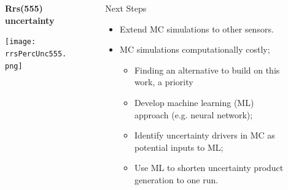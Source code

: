 \documentclass[final]{beamer}
\newlength{\sepwid}
\newlength{\onecolwid}
\newlength{\twocolwid}
\begin{document}
\begin{frame}[t]
\begin{columns}[t]
\begin{column}{\twocolwid}
\begin{figure}
\centering
\textbf{Rrs(555) uncertainty}\par\medskip
\texttt{[image: rrsPercUnc555.png]}
\end{figure}


\begin{columns}[t,totalwidth=\twocolwid] %
\begin{column}{\onecolwid} %







\end{column} %

\end{columns} %

\end{column} %


\begin{column}{\onecolwid} %


\begin{block}{Next Steps}
\begin{itemize}
\item Extend MC simulations to other sensors.
\item MC simulations computationally costly;
	\begin{itemize}
	\item Finding an alternative to build on this work, a priority
	\item Develop machine learning (ML) approach (e.g. neural network);
	\item Identify uncertainty drivers in MC as potential inputs to ML;
 	\item Use ML to shorten uncertainty product generation to one run. 
	\end{itemize}
\end{itemize}


\end{block}
\end{column}
\end{columns}
\end{frame}
\end{document}
